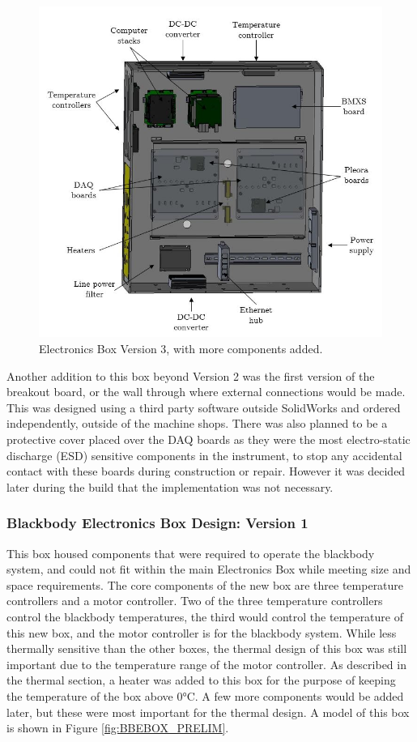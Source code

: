 \begin{figure}
    \centering
    \includegraphics[width=\textwidth]{chap3_images/LIFE_V5_initial_images/Ebox_V3_init_labelled.JPG}
    \caption{Electronics Box Version 3, with more components added.}
    \label{fig:EBOX_V3}
\end{figure}

Another addition to this box beyond Version 2 was the first version of the breakout board, or the wall through where external connections would be made. This was designed using a third party software outside SolidWorks and ordered independently, outside of the machine shops. There was also planned to be a protective cover placed over the DAQ boards as they were the most electro-static discharge (ESD) sensitive components in the instrument, to stop any accidental contact with these boards during construction or repair. However it was decided later during the build that the implementation was not necessary. 

\subsubsection{Blackbody Electronics Box Design: Version 1}
This box housed components that were required to operate the blackbody system, and could not fit within the main Electronics Box while meeting size and space requirements. The core components of the new box are three temperature controllers and a motor controller. Two of the three temperature controllers control the blackbody temperatures, the third would control the temperature of this new box, and the motor controller is for the blackbody system. While less thermally sensitive than the other boxes, the thermal design of this box was still important due to the temperature range of the motor controller. As described in the thermal section, a heater was added to this box for the purpose of keeping the temperature of the box above 0°C. A few more components would be added later, but these were most important for the thermal design. A model of this box is shown in Figure \ref{fig:BBEBOX_PRELIM}.

